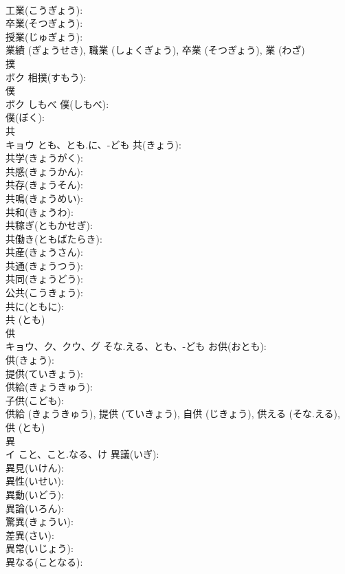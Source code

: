 \documentclass[8pt]{extreport}
\begin{document}
\begin{CJK}{UTF8}{min}
\\	工業(こうぎょう): 
\\	卒業(そつぎょう): 
\\	授業(じゅぎょう): 
\\	業績 (ぎょうせき), 職業 (しょくぎょう), 卒業 (そつぎょう), 業 (わざ)
\\	撲			
\\	ボク		相撲(すもう): 
\\	僕			
\\	ボク	しもべ	僕(しもべ): 
\\	僕(ぼく): 
\\	共			
\\	キョウ	とも、とも.に、-ども	共(きょう): 
\\	共学(きょうがく): 
\\	共感(きょうかん): 
\\	共存(きょうそん): 
\\	共鳴(きょうめい): 
\\	共和(きょうわ): 
\\	共稼ぎ(ともかせぎ): 
\\	共働き(ともばたらき): 
\\	共産(きょうさん): 
\\	共通(きょうつう): 
\\	共同(きょうどう): 
\\	公共(こうきょう): 
\\	共に(ともに): 
\\	共 (とも)
\\	供			
\\	キョウ、ク、クウ、グ	そな.える、とも、-ども	お供(おとも): 
\\	供(きょう): 
\\	提供(ていきょう): 
\\	供給(きょうきゅう): 
\\	子供(こども): 
\\	供給 (きょうきゅう), 提供 (ていきょう), 自供 (じきょう), 供える (そな.える), 供 (とも)
\\	異			
\\	イ	こと、こと.なる、け	異議(いぎ): 
\\	異見(いけん): 
\\	異性(いせい): 
\\	異動(いどう): 
\\	異論(いろん): 
\\	驚異(きょうい): 
\\	差異(さい): 
\\	異常(いじょう): 
\\	異なる(ことなる): 

\end{CJK}
\end{document}
